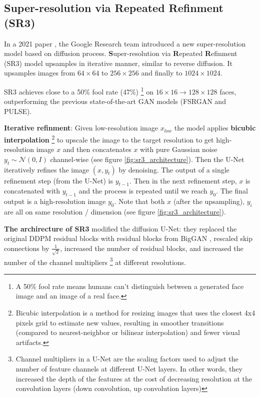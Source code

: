 \subsection{Super-resolution via Repeated Refinment (SR3)}

\label{subsec:imagen_sr3}

In a 2021 paper \cite{sr3}, the Google Research team introduced a new super-resolution model based on diffusion process. \textbf{S}uper-resolution via \textbf{R}epeated \textbf{R}efinment (SR3) model upsamples in iterative manner, similar to reverse diffusion. It upsamples images from $64\times 64$ to $256\times 256$ and finally to $1024\times 1024$.

SR3 achieves close to a 50\% fool rate (47\%) \footnote{A 50\% fool rate means humans can't distinguish between a generated face image and an image of a real face.} on $16\times 16 \rightarrow 128\times 128$ faces, outperforming the previous state-of-the-art GAN models (FSRGAN and PULSE).

\textbf{Iterative refinment}: Given low-resolution image $x_{low}$ the model applies \textbf{bicubic interpolation} \footnote{Bicubic interpolation is a method for resizing images that uses the closest 4x4 pixels grid to estimate new values, resulting in smoother transitions (compared to nearest-neighbor or bilinear interpolation) and fewer visual artifacts.} to upscale the image to the target resolution to get high-resolution image $x$ and then concatenates $x$ with pure Gaussian noise $y_t \sim \mathcal{N} (0, I)$ channel-wise (see figure \ref{fig:sr3_architecture}). Then the U-Net iteratively refines the image $(x, y_t)$ by denoising. The output of a single refinement step (from the U-Net) is $y_{t-1}$. Then in the next refinement step, $x$ is concatenated with $y_{t-1}$ and the process is repeated until we reach $y_0$. The final output is a high-resolution image $y_0$. Note that both $x$ (after the upsampling), $y_i$ are all on same resolution / dimension (see figure \ref{fig:sr3_architecture}).

\textbf{The archirecture of SR3} modified the diffusion U-Net: they replaced the original DDPM residual blocks with residual blocks from BigGAN \cite{biggan_deep}, rescaled skip connections by $\frac{1}{\sqrt{2}}$, increased the number of residual blocks, and increased the number of the channel multipliers \footnote{Channel multipliers in a U-Net are the scaling factors used to adjust the number of feature channels at different U-Net layers. In other words, they increased the depth of the features at the cost of decreasing resolution at the convolution layers (down convolution, up convolution layers)} at different resolutions.

